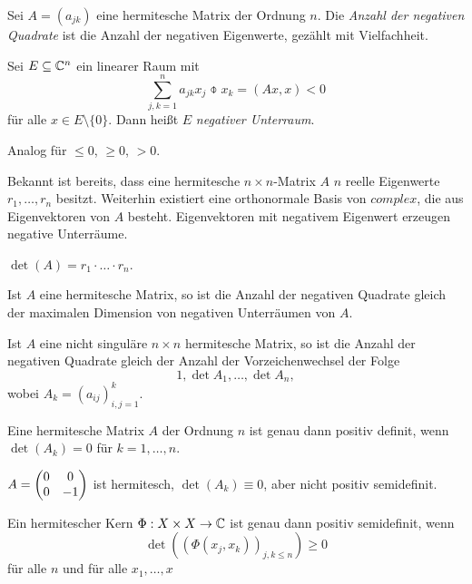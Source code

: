 \begin{defn}
  Sei $A = (a_{jk})$ eine hermitesche Matrix der Ordnung $n$. Die \emph{Anzahl
    der negativen Quadrate} ist die Anzahl der negativen Eigenwerte, gezählt mit
  Vielfachheit.

  Sei $E \subseteq \mathbb{C}^n$ ein linearer Raum mit
  \[ \sum_{j,k=1}^n a_{jk} x_j \obar{x_k} = (Ax, x) < 0 \]
  für alle $x \in E \setminus \{ 0 \}$. Dann heißt $E$ \emph{negativer
    Unterraum}.

  Analog für $\le 0$, $\ge 0$, $> 0$.
\end{defn}

\begin{rmrk}
  Bekannt ist bereits, dass eine hermitesche $n \times n$-Matrix $A$ $n$ reelle
  Eigenwerte $r_1, \ldots, r_n$ besitzt. Weiterhin existiert eine orthonormale
  Basis von $complex$, die aus Eigenvektoren von $A$ besteht. Eigenvektoren mit
  negativem Eigenwert erzeugen negative Unterräume.
\end{rmrk}

\begin{rmrk*}
  $\det(A) = r_1 \cdot \ldots \cdot r_n$.
\end{rmrk*}

\begin{thm}
  Ist $A$ eine hermitesche Matrix, so ist die Anzahl der negativen Quadrate
  gleich der maximalen Dimension von negativen Unterräumen von $A$.
\end{thm}

\begin{thm}
  Ist $A$ eine nicht singuläre $n \times n$ hermitesche Matrix, so ist die
  Anzahl der negativen Quadrate gleich der Anzahl der Vorzeichenwechsel der
  Folge
  \[ 1, \det A_1, \ldots, \det A_n, \]
  wobei $A_k = (a_{ij})_{i,j = 1}^k$.
\end{thm}

\begin{folg}
  Eine hermitesche Matrix $A$ der Ordnung $n$ ist genau dann positiv definit,
  wenn $\det(A_k) = 0$ für $k = 1, \ldots, n$.
\end{folg}

\begin{exmp*}
  $A = \begin{pmatrix}0 & 0 \\ 0 & -1\end{pmatrix}$ ist hermitesch, $\det( A_k ) \equiv 0$, aber nicht
  positiv semidefinit.
\end{exmp*}

\begin{thm} %
  Ein hermitescher Kern $\Phi : X \times X \to \mathbb{C}$ ist genau dann positiv
  semidefinit, wenn
  \[ \det (( \Phi(x_j, x_k))_{j,k \le n}) \ge 0 \]
  für alle $n$ und für alle $x_1, \ldots, x$
\end{thm}

